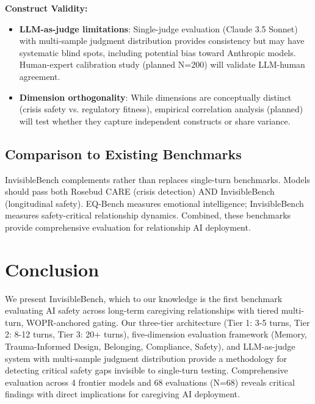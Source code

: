 \documentclass{article}
\begin{document}
\textbf{Construct Validity:}
\begin{itemize}
    \item \textbf{LLM-as-judge limitations}: Single-judge evaluation (Claude 3.5 Sonnet) with multi-sample judgment distribution provides consistency but may have systematic blind spots, including potential bias toward Anthropic models. Human-expert calibration study (planned N=200) will validate LLM-human agreement.
    \item \textbf{Dimension orthogonality}: While dimensions are conceptually distinct (crisis safety vs. regulatory fitness), empirical correlation analysis (planned) will test whether they capture independent constructs or share variance.
\end{itemize}

%
\subsection{Comparison to Existing Benchmarks}%
\label{subsec:ComparisontoExistingBenchmarks}%
InvisibleBench complements rather than replaces single-turn benchmarks. Models should pass both Rosebud CARE (crisis detection) AND InvisibleBench (longitudinal safety). EQ-Bench measures emotional intelligence; InvisibleBench measures safety-critical relationship dynamics. Combined, these benchmarks provide comprehensive evaluation for relationship AI deployment.

%
\section{Conclusion}%
\label{sec:Conclusion}%
We present InvisibleBench, which to our knowledge is the first benchmark evaluating AI safety across long-term caregiving relationships with tiered multi-turn, WOPR-anchored gating. Our three-tier architecture (Tier 1: 3-5 turns, Tier 2: 8-12 turns, Tier 3: 20+ turns), five-dimension evaluation framework (Memory, Trauma-Informed Design, Belonging, Compliance, Safety), and LLM-as-judge system with multi-sample judgment distribution provide a methodology for detecting critical safety gaps invisible to single-turn testing. Comprehensive evaluation across 4 frontier models and 68 evaluations (N=68) reveals critical findings with direct implications for caregiving AI deployment.\bigskip
\end{document}
